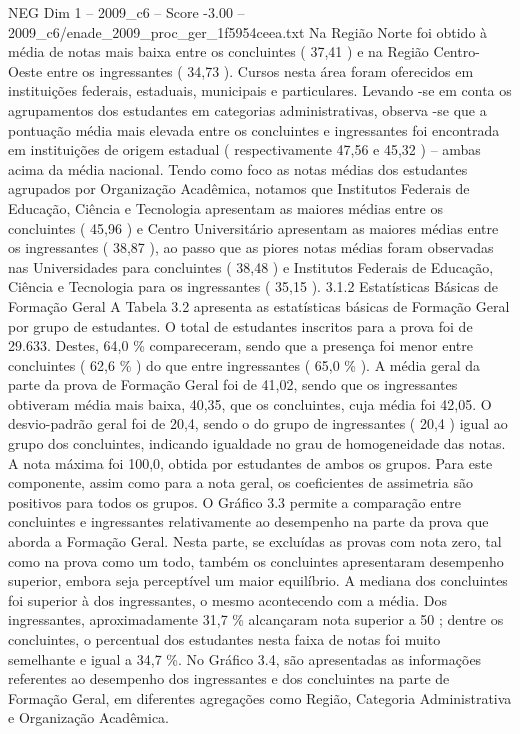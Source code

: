\begin{textsample}{NEG Dim 1 – 2009\_c6 – Score -3.00 – 2009\_c6/enade\_2009\_proc\_ger\_1f5954ceea.txt}
Na Região Norte foi obtido à média de notas mais baixa entre os concluintes ( 37,41 ) e na Região Centro-Oeste entre os ingressantes ( 34,73 ).
Cursos nesta área foram oferecidos em instituições federais, estaduais, municipais e particulares.
Levando -se em conta os agrupamentos dos estudantes em categorias administrativas, observa -se que a pontuação média mais elevada entre os concluintes e ingressantes foi encontrada em instituições de origem estadual ( respectivamente 47,56 e 45,32 ) – ambas acima da média nacional.
Tendo como foco as notas médias dos estudantes agrupados por Organização Acadêmica, notamos que Institutos Federais de Educação, Ciência e Tecnologia apresentam as maiores médias entre os concluintes ( 45,96 ) e Centro Universitário apresentam as maiores médias entre os ingressantes ( 38,87 ), ao passo que as piores notas médias foram observadas nas Universidades para concluintes ( 38,48 ) e Institutos Federais de Educação, Ciência e Tecnologia para os ingressantes ( 35,15 ). 3.1.2 Estatísticas Básicas de Formação Geral A Tabela 3.2 apresenta as estatísticas básicas de Formação Geral por grupo de estudantes.
O total de estudantes inscritos para a prova foi de 29.633.
Destes, 64,0 \% compareceram, sendo que a presença foi menor entre concluintes ( 62,6 \% ) do que entre ingressantes ( 65,0 \% ).
A média geral da parte da prova de Formação Geral foi de 41,02, sendo que os ingressantes obtiveram média mais baixa, 40,35, que os concluintes, cuja média foi 42,05.
O desvio-padrão geral foi de 20,4, sendo o do grupo de ingressantes ( 20,4 ) igual ao grupo dos concluintes, indicando igualdade no grau de homogeneidade das notas.
A nota máxima foi 100,0, obtida por estudantes de ambos os grupos.
Para este componente, assim como para a nota geral, os coeficientes de assimetria são positivos para todos os grupos.
O Gráfico 3.3 permite a comparação entre concluintes e ingressantes relativamente ao desempenho na parte da prova que aborda a Formação Geral.
Nesta parte, se excluídas as provas com nota zero, tal como na prova como um todo, também os concluintes apresentaram desempenho superior, embora seja perceptível um maior equilíbrio.
A mediana dos concluintes foi superior à dos ingressantes, o mesmo acontecendo com a média.
Dos ingressantes, aproximadamente 31,7 \% alcançaram nota superior a 50 ; dentre os concluintes, o percentual dos estudantes nesta faixa de notas foi muito semelhante e igual a 34,7 \%.
No Gráfico 3.4, são apresentadas as informações referentes ao desempenho dos ingressantes e dos concluintes na parte de Formação Geral, em diferentes agregações como Região, Categoria Administrativa e Organização Acadêmica.

\end{textsample}
